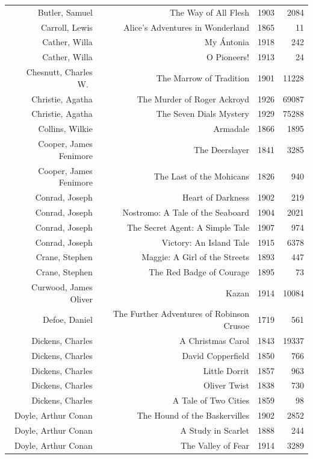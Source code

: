 \documentclass{article} %
\begin{document}
\begin{center}
\begin{tabularx}{\linewidth}{RRrr}
    Butler, Samuel & The Way of All Flesh & 1903 & 2084 \\
    Carroll, Lewis & Alice's Adventures in Wonderland & 1865 & 11 \\
    Cather, Willa & My \'{A}ntonia & 1918 & 242\\
    Cather, Willa & O Pioneers! & 1913 & 24 \\
    Chesnutt, Charles W.\ & The Marrow of Tradition & 1901 & 11228 \\
    Christie, Agatha & The Murder of Roger Ackroyd & 1926 & 69087 \\
    Christie, Agatha & The Seven Dials Mystery & 1929 & 75288 \\
    Collins, Wilkie & Armadale & 1866 & 1895 \\
    Cooper, James Fenimore & The Deerslayer & 1841 & 3285 \\
    Cooper, James Fenimore & The Last of the Mohicans & 1826 & 940 \\
    Conrad, Joseph & Heart of Darkness & 1902 & 219 \\
    Conrad, Joseph & Nostromo: A Tale of the Seaboard & 1904 & 2021 \\
    Conrad, Joseph & The Secret Agent: A Simple Tale & 1907 & 974 \\
    Conrad, Joseph & Victory: An Island Tale & 1915 & 6378 \\
    Crane, Stephen & Maggie: A Girl of the Streets & 1893 & 447 \\
    Crane, Stephen & The Red Badge of Courage & 1895 & 73 \\
    Curwood, James Oliver  & Kazan & 1914 & 10084 \\
    Defoe, Daniel & The Further Adventures of Robinson Crusoe & 1719 & 561 \\
    Dickens, Charles & A Christmas Carol & 1843 & 19337 \\
    Dickens, Charles & David Copperfield & 1850 & 766 \\
    Dickens, Charles & Little Dorrit & 1857 & 963 \\
    Dickens, Charles & Oliver Twist & 1838 & 730 \\
    Dickens, Charles & A Tale of Two Cities & 1859 & 98 \\
    Doyle, Arthur Conan & The Hound of the Baskervilles & 1902 & 2852 \\
    Doyle, Arthur Conan & A Study in Scarlet & 1888 & 244 \\
    Doyle, Arthur Conan & The Valley of Fear & 1914 & 3289 \\

\end{tabularx}
\end{center}
\end{document}
